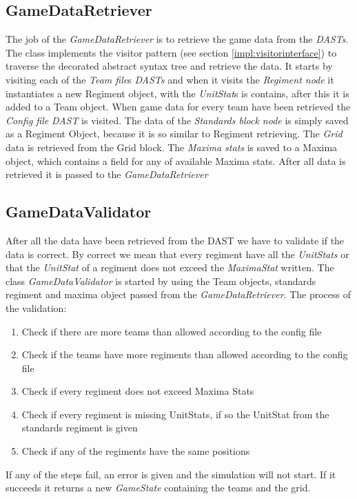 \subsection{GameDataRetriever}
	The job of the {\it GameDataRetriever} is to retrieve the game data from the {\it DASTs}. The class implements the visitor pattern
	(see section \ref{impl:visitorinterface}) to traverse the decorated abstract syntax tree and retrieve the data. 
	It starts by visiting each of the {\it Team file}s {\it DASTs} and when it visits the {\it Regiment node} it instantiates a new Regiment object, 
	with the {\it UnitStat}s is contains, after this it is added to a Team object. When game data for every team have been retrieved the {\it Config file}
	{\it DAST} is visited. The data of the {\it Standards block node} is simply saved as a Regiment Object, because it is so similar to Regiment retrieving. 
	The {\it Grid} data is retrieved from the Grid block. The {\it Maxima stats} is saved to a Maxima object, which contains a field for any of available 
	Maxima stats. After all data is retrieved it is passed to the {\it GameDataRetriever}

\subsection{GameDataValidator}
	After all the data have been retrieved from the DAST we have to validate if the data is correct. 
	By correct we mean that every regiment have all the {\it UnitStats} or that the {\it UnitStat} 
	of a regiment does not exceed the {\it MaximaStat} written. 
	The class {\it GameDataValidator} is started by using the Team objects, standards regiment and maxima object passed from the {\it GameDataRetriever}.
	The process of the validation: \\
	\begin{enumerate}
		\item Check if there are more teams than allowed according to the config file
		\item Check if the teams have more regiments than allowed according to the config file
		\item Check if every regiment does not exceed Maxima Stats
		\item Check if every regiment is missing UnitStats, if so the UnitStat from the standards regiment is given
		\item Check if any of the regiments have the same positions
	\end{enumerate}
	If any of the steps fail, an error is given and the simulation will not start. If it succeeds it returns a new {\it GameState} containing the teams 
	and the grid.
	
